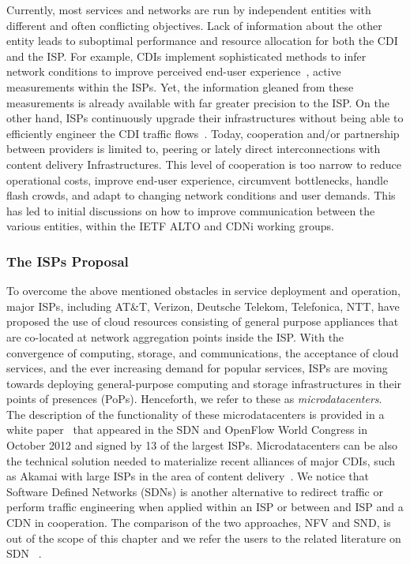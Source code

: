 Currently, most services and networks are run by independent entities with
different and often conflicting objectives. Lack of information about the other
entity leads to suboptimal performance and resource allocation for both the CDI
and the ISP. For example, CDIs implement sophisticated methods to infer network
conditions to improve perceived end-user experience~\cite{Akamai-Network}, \eg
active measurements within the ISPs. Yet, the information gleaned from these
measurements is already available with far greater precision to the ISP. On the
other hand, ISPs continuously upgrade their infrastructures without being able
to efficiently engineer the CDI traffic flows~\cite{PADIS2010}. Today,
cooperation and/or partnership between providers is limited to, \eg peering or
lately direct interconnections with content delivery Infrastructures. This
level of cooperation is too narrow to reduce operational costs, improve
end-user experience, circumvent bottlenecks, handle flash crowds, and adapt to
changing network conditions and user demands. This has led to initial
discussions on how to improve communication between the various entities, \eg
within the IETF ALTO and CDNi working groups.


\subsubsection{The ISPs Proposal}\label{NFV}

To overcome the above mentioned obstacles in service deployment and operation,
major ISPs, including AT\&T, Verizon, Deutsche Telekom, Telefonica, NTT, have proposed
the use of cloud resources consisting of general purpose appliances that are
co-located at network aggregation points inside the ISP. With the convergence
of computing, storage, and communications, the acceptance of cloud services,
and the ever increasing demand for popular services, ISPs are moving towards
deploying general-purpose computing and storage infrastructures in their points
of presences (PoPs). Henceforth, we refer to these as \emph{microdatacenters}.
The description of the functionality of these microdatacenters is provided in a
white paper~\cite{NFV} that appeared in the SDN and OpenFlow World Congress in
October 2012 and signed by 13 of the largest ISPs. Microdatacenters can be also
the technical solution needed to materialize recent alliances of major CDIs,
such as Akamai with large ISPs in the area of content
delivery~\cite{content-delivery-alliance1,content-delivery-alliance2,content-delivery-alliance3}.
We notice that Software Defined Networks (SDNs) is another alternative to
redirect traffic or perform traffic engineering when applied within an ISP or
between and ISP and a CDN in cooperation.  The comparison of the two
approaches, NFV and SND, is out of the scope of this chapter and we refer the
users to the related literature on SDN
\eg~\cite{Ethane,NOX,OpenFlow,SDN-Internet-Infrastructure,B4}.

